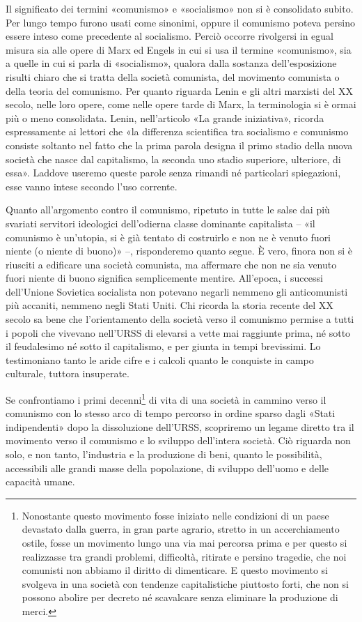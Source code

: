 \documentclass[../main]{subfiles}
\begin{document}
Il significato dei termini «comunismo» e «socialismo» non si è consolidato subito. Per lungo tempo furono usati come sinonimi, oppure il comunismo poteva persino essere inteso come precedente al socialismo. Perciò occorre rivolgersi in egual misura sia alle opere di Marx ed Engels in cui si usa il termine «comunismo», sia a quelle in cui si parla di «socialismo», qualora dalla sostanza dell'esposizione risulti chiaro che si tratta della società comunista, del movimento comunista o della teoria del comunismo. Per quanto riguarda Lenin e gli altri marxisti del XX secolo, nelle loro opere, come nelle opere tarde di Marx, la terminologia si è ormai più o meno consolidata. Lenin, nell'articolo «La grande iniziativa», ricorda espressamente ai lettori che «la differenza scientifica tra socialismo e comunismo consiste soltanto nel fatto che la prima parola designa il primo stadio della nuova società che nasce dal capitalismo, la seconda uno stadio superiore, ulteriore, di essa». Laddove useremo queste parole senza rimandi né particolari spiegazioni, esse vanno intese secondo l'uso corrente.

Quanto all'argomento contro il comunismo, ripetuto in tutte le salse dai più svariati servitori ideologici dell'odierna classe dominante capitalista – «il comunismo è un'utopia, si è già tentato di costruirlo e non ne è venuto fuori niente (o niente di buono)» –, risponderemo quanto segue. È vero, finora non si è riusciti a edificare una società comunista, ma affermare che non ne sia venuto fuori niente di buono significa semplicemente mentire. All'epoca, i successi dell'Unione Sovietica socialista non potevano negarli nemmeno gli anticomunisti più accaniti, nemmeno negli Stati Uniti. Chi ricorda la storia recente del XX secolo sa bene che l'orientamento della società verso il comunismo permise a tutti i popoli che vivevano nell'URSS di elevarsi a vette mai raggiunte prima, né sotto il feudalesimo né sotto il capitalismo, e per giunta in tempi brevissimi. Lo testimoniano tanto le aride cifre e i calcoli quanto le conquiste in campo culturale, tuttora insuperate.

Se confrontiamo i primi decenni\footnote{Nonostante questo movimento fosse iniziato nelle condizioni di un paese devastato dalla guerra, in gran parte agrario, stretto in un accerchiamento ostile, fosse un movimento lungo una via mai percorsa prima e per questo si realizzasse tra grandi problemi, difficoltà, ritirate e persino tragedie, che noi comunisti non abbiamo il diritto di dimenticare. E questo movimento si svolgeva in una società con tendenze capitalistiche piuttosto forti, che non si possono abolire per decreto né scavalcare senza eliminare la produzione di merci.} di vita di una società in cammino verso il comunismo con lo stesso arco di tempo percorso in ordine sparso dagli «Stati indipendenti» dopo la dissoluzione dell'URSS, scopriremo un legame diretto tra il movimento verso il comunismo e lo sviluppo dell'intera società. Ciò riguarda non solo, e non tanto, l'industria e la produzione di beni, quanto le possibilità, accessibili alle grandi masse della popolazione, di sviluppo dell'uomo e delle capacità umane.
\end{document}
